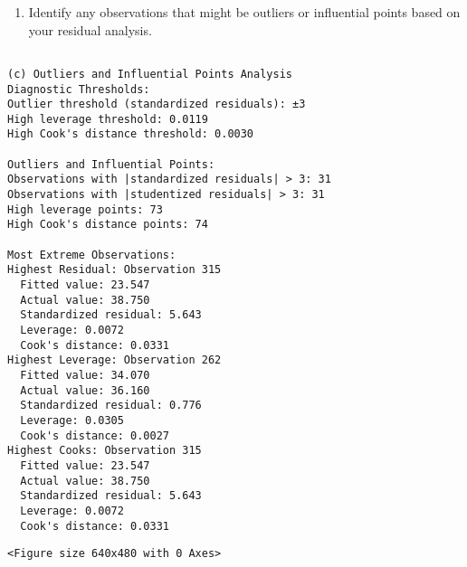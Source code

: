 \documentclass[8pt, twocolumn]{extarticle}
\providecommand{\tightlist}{%
      \setlength{\itemsep}{0pt}\setlength{\parskip}{0pt}}
\begin{document}
    \begin{enumerate}
\def\labelenumi{(\alph{enumi})}
\setcounter{enumi}{2}
\tightlist
\item
  Identify any observations that might be outliers or influential points
  based on your residual analysis.
\end{enumerate}

    \begin{Verbatim}[commandchars=\\\{\}]

(c) Outliers and Influential Points Analysis
Diagnostic Thresholds:
Outlier threshold (standardized residuals): ±3
High leverage threshold: 0.0119
High Cook's distance threshold: 0.0030

Outliers and Influential Points:
Observations with |standardized residuals| > 3: 31
Observations with |studentized residuals| > 3: 31
High leverage points: 73
High Cook's distance points: 74

Most Extreme Observations:
Highest Residual: Observation 315
  Fitted value: 23.547
  Actual value: 38.750
  Standardized residual: 5.643
  Leverage: 0.0072
  Cook's distance: 0.0331
Highest Leverage: Observation 262
  Fitted value: 34.070
  Actual value: 36.160
  Standardized residual: 0.776
  Leverage: 0.0305
  Cook's distance: 0.0027
Highest Cooks: Observation 315
  Fitted value: 23.547
  Actual value: 38.750
  Standardized residual: 5.643
  Leverage: 0.0072
  Cook's distance: 0.0331
    \end{Verbatim}

    
    \begin{Verbatim}[commandchars=\\\{\}]
<Figure size 640x480 with 0 Axes>
    \end{Verbatim}
\end{document}
